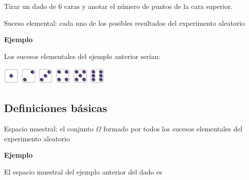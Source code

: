 \documentclass[]{book}
\begin{document}
Tirar un dado de 6 caras y anotar el número de puntos de la cara superior.

Suceso elemental: cada uno de los posibles resultados del experimento aleatorio

\textbf{Ejemplo}

Los sucesos elementales del ejemplo anterior serían:

\includegraphics{Images/proba1dibujos/dice/1.png} \includegraphics{Images/proba1dibujos/dice/2.png} \includegraphics{Images/proba1dibujos/dice/3.png} \includegraphics{Images/proba1dibujos/dice/4.png} \includegraphics{Images/proba1dibujos/dice/5.png} \includegraphics{Images/proba1dibujos/dice/6.png}

\hypertarget{definiciones-buxe1sicas}{%
\subsection{Definiciones básicas}\label{definiciones-buxe1sicas}}

 Espacio muestral: el conjunto \(\Omega\) formado por todos los sucesos elementales del experimento aleatorio

\textbf{Ejemplo}

El espacio muestral del ejemplo anterior del dado es
\end{document}
